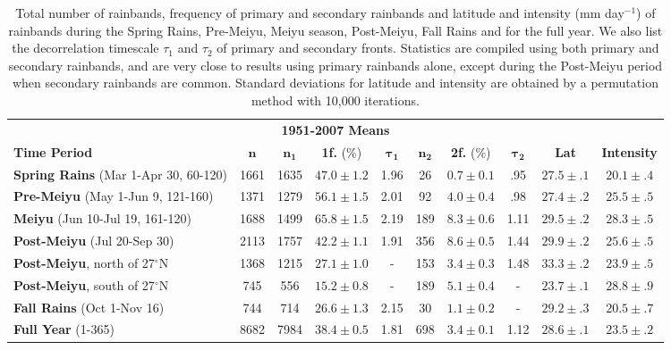 \documentclass[final,grl]{agutexSI}
\begin{document}
\begin{table}

\caption{Total number of rainbands, frequency of primary and secondary rainbands and latitude and intensity (mm day$^{-1}$) of rainbands during the Spring Rains, Pre-Meiyu, Meiyu season, Post-Meiyu, Fall Rains and for the full year. We also list the decorrelation timescale $\tau_1$  and $\tau_2$ of primary and secondary fronts. Statistics are compiled using both primary and secondary rainbands, and are very close to results using primary rainbands alone, except during the Post-Meiyu period when secondary rainbands are common. Standard deviations for latitude and intensity are obtained by a permutation method with 10,000 iterations.}

\begin{tabular}{ l c c c c c c c c c}
	 \multicolumn{10}{c}{\textbf{1951-2007 Means}} \\
	 \textbf{Time Period} & $\boldsymbol{n}$ & $\boldsymbol{n_1}$ & \textbf{1f.} (\%) & $\boldsymbol{\tau_1}$ & $\boldsymbol{n_2}$ & \textbf{2f.} (\%) & $\boldsymbol{\tau_2}$ & \textbf{Lat} & \textbf{Intensity} \\
	 \hline
	\textbf{Spring Rains} (Mar 1-Apr 30, 60-120) & 1661 & 1635 	& $47.0 \pm 1.2$ 	& 1.96	& 26 	&$0.7 \pm 0.1$ 	& .95 	& $27.5 \pm .1$ & $20.1 \pm .4$ \\
	\textbf{Pre-Meiyu} (May 1-Jun 9, 121-160) & 1371 & 1279  	& $56.1 \pm 1.5$ 	& 2.01	& 92 	&$4.0 \pm 0.4$	& .98 	& $27.4 \pm .2$ & $25.5 \pm .5$ \\
	\textbf{Meiyu} (Jun 10-Jul 19, 161-120) & 1688 & 1499 		& $65.8 \pm 1.5$ 	& 2.19	& 189 	&$8.3 \pm 0.6$ 	& 1.11	& $29.5 \pm .2$ & $28.3 \pm .5$ \\
	\textbf{Post-Meiyu} (Jul 20-Sep 30) & 2113 & 1757 			& $42.2 \pm 1.1 $	& 1.91 	& 356 	&$8.6 \pm 0.5$ 	& 1.44	& $29.9 \pm .2$ & $25.6 \pm .5$ \\
	\textbf{Post-Meiyu}, north of 27$^\circ$N & 1368 & 1215 	& $27.1 \pm 1.0 $ 	& -		& 153 	&$3.4 \pm 0.3$ 	& 1.48	& $33.3 \pm .2$ & $23.9 \pm .5$ \\
	\textbf{Post-Meiyu}, south of 27$^\circ$N & 745 & 556 		& $15.2 \pm 0.8 $ 	& -		& 189 	&$5.1 \pm 0.4$ 	& -		& $23.7 \pm .1$ & $28.8 \pm .9$ \\
	\textbf{Fall Rains} (Oct 1-Nov 16) & 744 & 714 				& $26.6 \pm 1.3 $ 	& 2.15	& 30 	&$1.1 \pm 0.2$	& - 		& $29.2 \pm .3$ & $20.5 \pm .7$ \\
	\textbf{Full Year} (1-365) & 8682 & 7984 					& $38.4 \pm 0.5$ 	& 1.81 	& 698 	&$3.4 \pm 0.1$ 	& 1.12	& $28.6 \pm .1$ & $23.5 \pm .2$ \\
\end{tabular}
\label{ts4}
\end{table}
\end{document}
